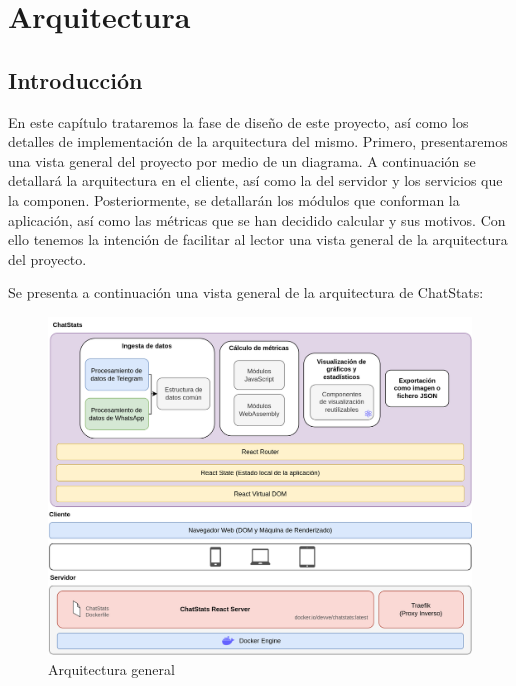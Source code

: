 \chapter{Arquitectura}
\label{chap:architecture}


\section{Introducción}
\label{sec:introduction}

En este capítulo trataremos la fase de diseño de este proyecto, así como los detalles de implementación de la arquitectura del mismo. Primero, presentaremos una vista general del proyecto por medio de un diagrama. A continuación se detallará la arquitectura en el cliente, así como la del servidor y los servicios que la componen. Posteriormente, se detallarán los módulos que conforman la aplicación, así como las métricas que se han decidido calcular y sus motivos. Con ello tenemos la intención de facilitar al lector una vista general de la arquitectura del proyecto.

Se presenta a continuación una vista general de la arquitectura de ChatStats:

\begin{figure}[H]
	\centering
	\includegraphics[width=\textwidth]{img/architecture.png}
	\caption{Arquitectura general}
	\label{fig:chap4:architecture_general}
\end{figure}



